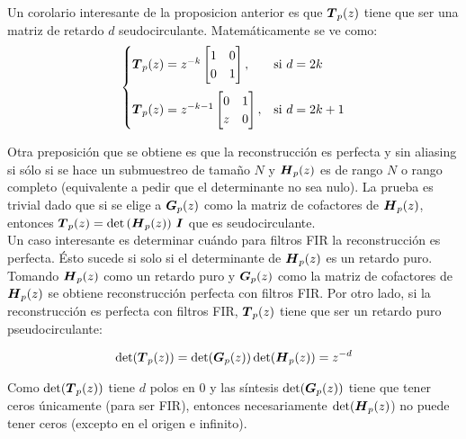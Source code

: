 		Un corolario interesante de la proposicion anterior es que $\boldsymbol{T}_p(z)$ tiene que ser una matriz de retardo $d$ seudocirculante. Matemáticamente se ve como:
		\begin{equation*}
		\begin{cases}\boldsymbol{T}_p(z)=z^{-k}\begin{bmatrix}1&0\\0&1\end{bmatrix}, &\text{si }d=2k \\[0.5cm]
		\boldsymbol{T}_p(z)=z^{-k-1}\begin{bmatrix}0&1\\z&0\end{bmatrix}, &\text{si }d=2k+1\end{cases}
		\end{equation*}

		Otra preposición que se obtiene es que la reconstrucción es perfecta y sin aliasing si sólo si se hace un submuestreo de tamaño $N$ y $\boldsymbol{H}_p(z)$ es de rango $N$ o rango completo (equivalente a pedir que el determinante no sea nulo). La prueba es trivial dado que si se elige a $\boldsymbol{G}_p(z)$ como la matriz de cofactores de $\boldsymbol{H}_p(z)$, entonces $\boldsymbol{T}_p(z) = \det\left(\boldsymbol{H}_p(z)\right)\,\boldsymbol{I}$ que es seudocirculante.\\

		Un caso interesante es determinar cuándo para filtros FIR la reconstrucción es perfecta. Ésto sucede si solo si el determinante de $\boldsymbol{H}_p(z)$ es un retardo puro.\\
		\indent Tomando $\boldsymbol{H}_p(z)$ como un retardo puro y $\boldsymbol{G}_p(z)$ como la matriz de cofactores de $\boldsymbol{H}_p(z)$ se obtiene reconstrucción perfecta con filtros FIR. Por otro lado, si la reconstrucción es perfecta con filtros FIR, $\boldsymbol{T}_p(z)$ tiene que ser un retardo puro pseudocirculante: 
		
		\begin{equation*}
			\det(\boldsymbol{T}_p(z)) = \det(\boldsymbol{G}_p(z)) \det(\boldsymbol{H}_p(z)) = z^{-d}
		\end{equation*}
		
		Como $\det(\boldsymbol{T}_p(z))$ tiene $d$ polos en 0 y las síntesis $\det(\boldsymbol{G}_p(z))$ tiene que tener ceros únicamente (para ser FIR), entonces necesariamente $\det(\boldsymbol{H}_p(z)$) no puede tener ceros (excepto en el origen e infinito).\\


